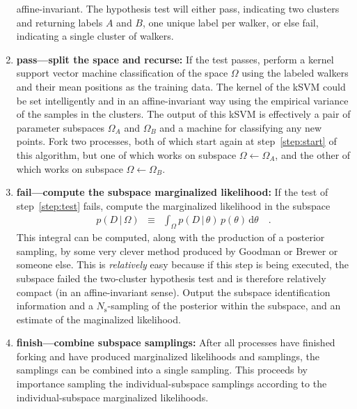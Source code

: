 \documentclass[12pt]{article}
\newcommand{\given}{\,|\,}
\newcommand{\dd}{\mathrm{d}}
\newcommand{\data}{D}
\newcommand{\pars}{\theta}
\newcommand{\parspace}{\Omega}
\newcommand{\nsample}{N_{\mathrm{s}}}
\begin{document}
\begin{enumerate}
  affine-invariant. The hypothesis test will either pass, indicating
  two clusters and returning labels $A$ and $B$, one unique label per
  walker, or else fail, indicating a single cluster of walkers.
\item \textbf{pass---split the space and recurse:} If the test passes,
  perform a kernel support vector machine classification of the space
  $\parspace$ using the labeled walkers and their mean positions as
  the training data.  The kernel of the kSVM could be set
  intelligently and in an affine-invariant way using the empirical
  variance of the samples in the clusters.  The output of this kSVM is
  effectively a pair of parameter subspaces $\parspace_A$ and
  $\parspace_B$ and a machine for classifying any new points.  Fork
  two processes, both of which start again at step~\ref{step:start} of
  this algorithm, but one of which works on subspace
  $\parspace\leftarrow\parspace_A$, and the other of which works on
  subspace $\parspace\leftarrow\parspace_B$.
\item \textbf{fail---compute the subspace marginalized likelihood:} If
  the test of step~\ref{step:test} fails, compute the marginalized
  likelihood in the subspace
  \begin{eqnarray}
    p(\data\given\parspace)
    &\equiv&
    \int_\parspace p(\data\given\pars)\,p(\pars)\,\dd\pars
    \quad .
  \end{eqnarray}
  This integral can be computed, along with the production of a
  posterior sampling, by some very clever method produced by Goodman
  or Brewer or someone else.  This is \emph{relatively} easy because
  if this step is being executed, the subspace failed the two-cluster
  hypothesis test and is therefore relatively compact (in an
  affine-invariant sense).  Output the subspace identification
  information and a $\nsample$-sampling of the posterior within the
  subspace, and an estimate of the maginalized likelihood.
\item \textbf{finish---combine subspace samplings:} After all
  processes have finished forking and have produced marginalized
  likelihoods and samplings, the samplings can be combined into a
  single sampling.  This proceeds by importance sampling the
  individual-subspace samplings according to the individual-subspace
  marginalized likelihoods.
\end{enumerate}
\end{document}
